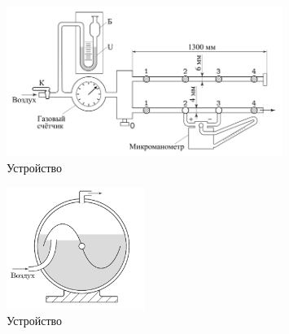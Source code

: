 \documentclass[a4paper]{article}
\begin{document}
\begin{figure}
    \centering
    \includegraphics[width=0.8\textwidth]{dev.PNG}
    \caption{Устройство}
\end{figure}

\begin{figure}
    \centering
    \includegraphics[width=0.4\textwidth]{gase.PNG}
    \caption{Устройство}
\end{figure}
\end{document}
